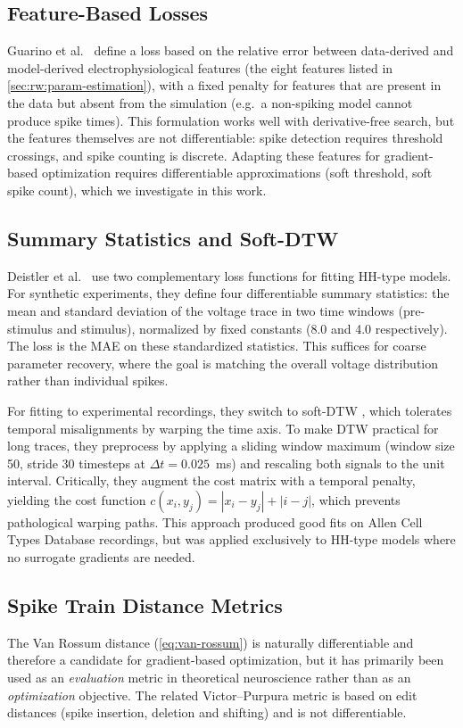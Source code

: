 \subsection{Feature-Based Losses}
Guarino et al.\ \cite{Guarino2025} define a loss based on the relative error between data-derived and model-derived electrophysiological features (the eight features listed in \cref{sec:rw:param-estimation}), with a fixed penalty for features that are present in the data but absent from the simulation (e.g.\ a non-spiking model cannot produce spike times).
This formulation works well with derivative-free search, but the features themselves are not differentiable: spike detection requires threshold crossings, and spike counting is discrete.
Adapting these features for gradient-based optimization requires differentiable approximations (soft threshold, soft spike count), which we investigate in this work.

\subsection{Summary Statistics and Soft-DTW}
Deistler et al.\ \cite{Deistler2025} use two complementary loss functions for fitting \gls{HH}-type models.
For synthetic experiments, they define four differentiable summary statistics: the mean and standard deviation of the voltage trace in two time windows (pre-stimulus and stimulus), normalized by fixed constants (8.0 and 4.0 respectively).
The loss is the \gls{MAE} on these standardized statistics.
This suffices for coarse parameter recovery, where the goal is matching the overall voltage distribution rather than individual spikes.

For fitting to experimental recordings, they switch to soft-DTW \cite{Blondel2018}, which tolerates temporal misalignments by warping the time axis.
To make DTW practical for long traces, they preprocess by applying a sliding window maximum (window size 50, stride 30 timesteps at $\Delta t = 0.025$~ms) and rescaling both signals to the unit interval.
Critically, they augment the cost matrix with a temporal penalty, yielding the cost function $c(x_i, y_j) = |x_i - y_j| + |i - j|$, which prevents pathological warping paths.
This approach produced good fits on Allen Cell Types Database recordings, but was applied exclusively to \gls{HH}-type models where no surrogate gradients are needed.

\subsection{Spike Train Distance Metrics}
The Van Rossum distance \cite{Rossum2001} (\cref{eq:van-rossum}) is naturally differentiable and therefore a candidate for gradient-based optimization, but it has primarily been used as an \emph{evaluation} metric in theoretical neuroscience rather than as an \emph{optimization} objective.
The related Victor--Purpura metric is based on edit distances (spike insertion, deletion and shifting) and is not differentiable.

